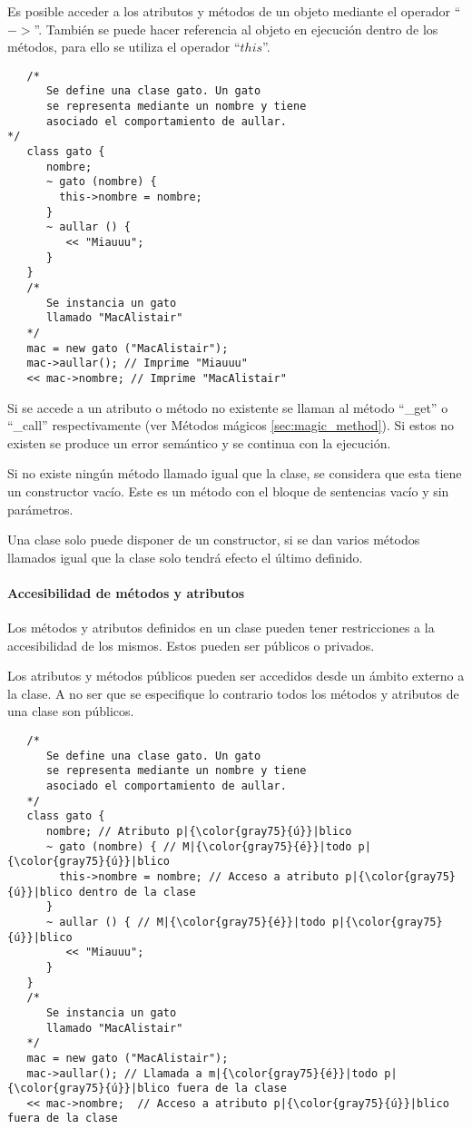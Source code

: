 Es posible acceder a los atributos y métodos de un objeto mediante el operador ``$->$''.
También se puede hacer referencia al objeto en ejecución dentro de los métodos, para ello se utiliza el operador ``$this$''. \\

\begin{lstlisting}
   /*
      Se define una clase gato. Un gato 
      se representa mediante un nombre y tiene
      asociado el comportamiento de aullar.
*/
   class gato {
      nombre;
      ~ gato (nombre) {
        this->nombre = nombre;
      }
      ~ aullar () {
         << "Miauuu";
      }
   }
   /*
      Se instancia un gato 
      llamado "MacAlistair"
   */
   mac = new gato ("MacAlistair"); 
   mac->aullar(); // Imprime "Miauuu"
   << mac->nombre; // Imprime "MacAlistair"
\end{lstlisting}

Si se accede a un atributo o método no existente se llaman al método ``\_get'' o ``\_call'' respectivamente (ver Métodos mágicos \autoref{sec:magic_method}). Si 
estos no existen se produce un error semántico y se continua con la ejecución.

Si no existe ningún método llamado igual que la clase, se considera que esta tiene un constructor vacío. Este es
un método con el bloque de sentencias vacío y sin parámetros.

Una clase solo puede disponer de un constructor, si se dan varios métodos llamados igual que la clase solo tendrá 
efecto el último definido.

\paragraph{Accesibilidad de métodos y atributos}
Los métodos y atributos definidos en un clase pueden tener restricciones a la accesibilidad de los mismos. Estos pueden ser públicos 
o privados.

Los atributos y métodos públicos pueden ser accedidos desde un ámbito externo a la clase. A no ser que se especifique lo contrario todos los
métodos y atributos de una clase son públicos. \\

\begin{lstlisting}
   /*
      Se define una clase gato. Un gato 
      se representa mediante un nombre y tiene
      asociado el comportamiento de aullar.
   */
   class gato {
      nombre; // Atributo p|{\color{gray75}{ú}}|blico
      ~ gato (nombre) { // M|{\color{gray75}{é}}|todo p|{\color{gray75}{ú}}|blico
        this->nombre = nombre; // Acceso a atributo p|{\color{gray75}{ú}}|blico dentro de la clase
      }
      ~ aullar () { // M|{\color{gray75}{é}}|todo p|{\color{gray75}{ú}}|blico
         << "Miauuu";
      }
   }
   /*
      Se instancia un gato 
      llamado "MacAlistair"
   */
   mac = new gato ("MacAlistair"); 
   mac->aullar(); // Llamada a m|{\color{gray75}{é}}|todo p|{\color{gray75}{ú}}|blico fuera de la clase
   << mac->nombre;  // Acceso a atributo p|{\color{gray75}{ú}}|blico fuera de la clase
\end{lstlisting}

